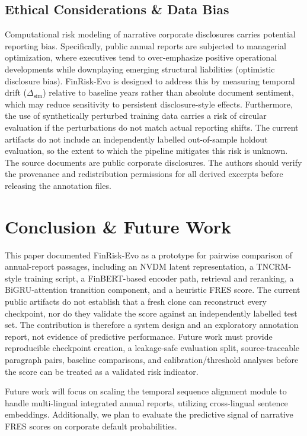 \documentclass[pdflatex,sn-basic,Numbered]{sn-jnl}
\begin{document}
\subsection{Ethical Considerations \& Data Bias}
Computational risk modeling of narrative corporate disclosures carries potential reporting bias. Specifically, public annual reports are subjected to managerial optimization, where executives tend to over-emphasize positive operational developments while downplaying emerging structural liabilities (optimistic disclosure bias). FinRisk-Evo is designed to address this by measuring temporal drift ($\Delta_{\text{sim}}$) relative to baseline years rather than absolute document sentiment, which may reduce sensitivity to persistent disclosure-style effects. Furthermore, the use of synthetically perturbed training data carries a risk of circular evaluation if the perturbations do not match actual reporting shifts. The current artifacts do not include an independently labelled out-of-sample holdout evaluation, so the extent to which the pipeline mitigates this risk is unknown. The source documents are public corporate disclosures. The authors should verify the provenance and redistribution permissions for all derived excerpts before releasing the annotation files.

\section{Conclusion \& Future Work}
This paper documented FinRisk-Evo as a prototype for pairwise comparison of annual-report passages, including an NVDM latent representation, a TNCRM-style training script, a FinBERT-based encoder path, retrieval and reranking, a BiGRU-attention transition component, and a heuristic FRES score. The current public artifacts do not establish that a fresh clone can reconstruct every checkpoint, nor do they validate the score against an independently labelled test set. The contribution is therefore a system design and an exploratory annotation report, not evidence of predictive performance. Future work must provide reproducible checkpoint creation, a leakage-safe evaluation split, source-traceable paragraph pairs, baseline comparisons, and calibration/threshold analyses before the score can be treated as a validated risk indicator.

Future work will focus on scaling the temporal sequence alignment module to handle multi-lingual integrated annual reports, utilizing cross-lingual sentence embeddings. Additionally, we plan to evaluate the predictive signal of narrative FRES scores on corporate default probabilities.
\end{document}
